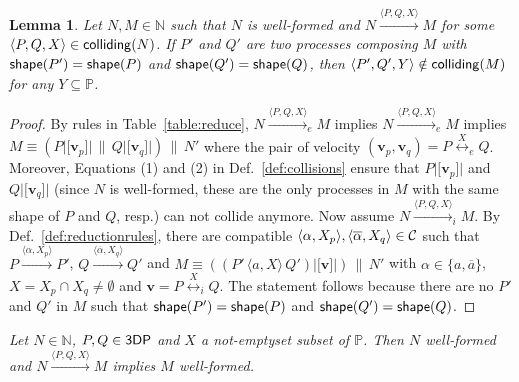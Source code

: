 \documentclass[11pt]{article}
\newcommand{\lsbrace}{\ensuremath{|\![}}
\newcommand{\rsbrace}{\ensuremath{]\!|}}
\newcommand{\vect}[1]{\mathbf{#1}}
\newcommand{\proc}{\sf{3DP}}
\newcommand{\channels}{{\cal C}}
\newcommand{\colliding}{{\sf colliding}}
\newcommand{\unionc}[1]{\,\langle #1 \rangle\,}
\newcommand{\nar}[1]{\xrightarrow{#1}}
\newcommand{\enar}[1]{\xrightarrow{#1}_{e}}
\newcommand{\inar}[1]{\xrightarrow{#1}_{i}}
\newcommand{\pos}{{\mathbb P}}
\newcommand{\nets}{{\mathbb N}}
\newcommand{\collision}[2]{\stackrel{{#1}}{\longleftrightarrow}_{#2}}
\newcommand{\shape}{{\sf shape}}
\newtheorem{lemma}{Lemma}
\begin{document}
\begin{lemma}\label{lemma:reduction-steps}
Let $N, M \in \nets$ such that $N$ is well-formed and $N \nar{\langle P, Q, X \rangle} M$ for some 
$\langle P,Q, X \rangle \in \colliding(N)$. If $P'$ and $Q'$ are two processes composing $M$ with
$\shape(P') = \shape(P)$ and $\shape(Q') = \shape(Q)$, then $\langle P',Q', Y \rangle \notin
\colliding(M)$ for any $Y \subseteq \pos$.
\end{lemma}

\begin{proof}
By rules in Table~\ref{table:reduce},  $N \enar{\langle P, Q, X \rangle} M$ implies $N \enar{\langle
P, Q, X \rangle} M$ implies $M \equiv (P \lsbrace \vect{v}_p\rsbrace \,\|\, Q\lsbrace \vect{v}_q
\rsbrace)
\,\|\, N'$ where the pair of velocity $(\vect{v}_p, \vect{v}_q) = P \collision{X}{e} Q$.
Moreover,  Equations (1) and (2) in Def.~\ref{def:collisions} ensure that $P \lsbrace
\vect{v}_p\rsbrace$ and $Q\lsbrace \vect{v}_q \rsbrace$ (since $N$ is well-formed, these are the
only processes in $M$ with the same shape of $P$ and $Q$, resp.) can not collide anymore.
Now assume $N \inar{\langle P, Q, X \rangle} M$. By Def.~\ref{def:reductionrules}, there are
compatible $\langle \alpha, X_p\rangle, \langle \overline{\alpha}, X_q \rangle \in \channels$ 
such that $P \nar{\langle \alpha, X_p\rangle} P'$, $Q \nar{\langle
\overline{\alpha}, X_q \rangle} Q'$ and $M \equiv  ((P' \unionc{a,X} Q') \lsbrace \vect{v} \rsbrace)
\,\|\, N'$ with $\alpha \in \{a,\overline{a}\}$, $X = X_p \cap X_q \neq \emptyset$ and $\vect{v} =
P \collision{X}{i} Q$. The statement follows because there  are no $P'$ and $Q'$ in $M$ such
that $\shape(P') = \shape(P)$  and $\shape(Q') = \shape(Q)$.

\end{proof}

\par\bigskip{}
\em Let $N \in \nets$, $P,Q \in \proc$ and $X$ a not-emptyset subset of $\pos$. Then $N$ well-formed
and $N \nar{\langle P, Q, X \rangle} M$ implies $M$ well-formed. \rm
\end{document}

